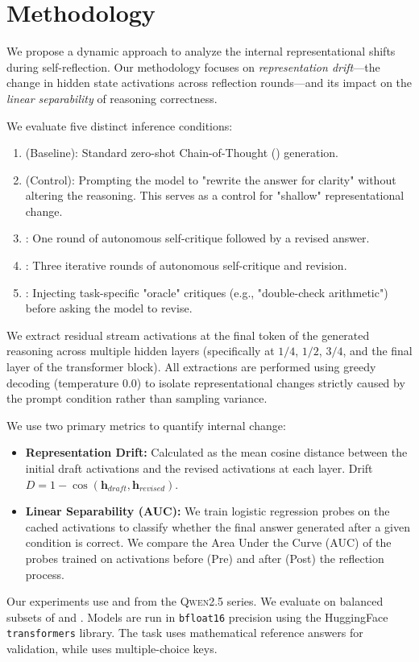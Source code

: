 \section{Methodology}
\label{sec:methodology}

We propose a dynamic approach to analyze the internal representational shifts during self-reflection. Our methodology focuses on \textit{representation drift}—the change in hidden state activations across reflection rounds—and its impact on the \textit{linear separability} of reasoning correctness.

 We evaluate five distinct inference conditions:
\begin{enumerate}[leftmargin=*,itemsep=0pt,topsep=0pt]
    \item \direct (Baseline): Standard zero-shot Chain-of-Thought (\CoT) generation.
    \item \rewrite (Control): Prompting the model to "rewrite the answer for clarity" without altering the reasoning. This serves as a control for "shallow" representational change.
    \item \selfone: One round of autonomous self-critique followed by a revised answer.
    \item \selfthree: Three iterative rounds of autonomous self-critique and revision.
    \item \external: Injecting task-specific "oracle" critiques (e.g., "double-check arithmetic") before asking the model to revise.
\end{enumerate}

 We extract residual stream activations at the final token of the generated reasoning across multiple hidden layers (specifically at $1/4$, $1/2$, $3/4$, and the final layer of the transformer block). All extractions are performed using greedy decoding (temperature 0.0) to isolate representational changes strictly caused by the prompt condition rather than sampling variance.

 We use two primary metrics to quantify internal change:
\begin{itemize}[leftmargin=*,itemsep=0pt,topsep=0pt]
    \item \textbf{Representation Drift:} Calculated as the mean cosine distance between the initial draft activations and the revised activations at each layer. Drift $D = 1 - \cos(\mathbf{h}_{draft}, \mathbf{h}_{revised})$.
    \item \textbf{Linear Separability (AUC):} We train logistic regression probes on the cached activations to classify whether the final answer generated after a given condition is correct. We compare the Area Under the Curve (AUC) of the probes trained on activations before (Pre) and after (Post) the reflection process.
\end{itemize}

 Our experiments use \qwenonefive and \qwenzerofive from the \textsc{Qwen2.5} series. We evaluate on balanced subsets of \gsm \citep{cobbe2021gsm8k} and \csqa \citep{talmor2019csqa}. Models are run in \texttt{bfloat16} precision using the HuggingFace \texttt{transformers} library. The \gsm task uses mathematical reference answers for validation, while \csqa uses multiple-choice keys.
